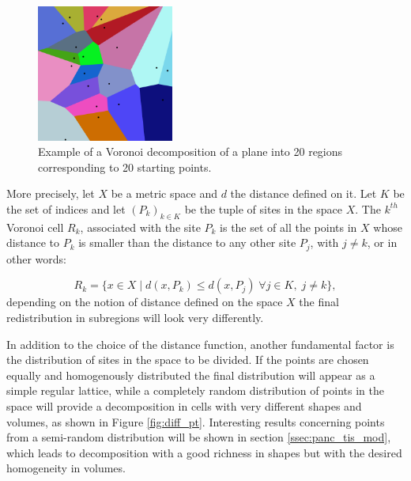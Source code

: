     \begin{figure}
        \centering
        \includegraphics[width = 0.4\textwidth]{images/vor_20}
        \caption{Example of a Voronoi decomposition of a plane into 20 regions corresponding to 20 starting points.}
        \label{fig:vor_20}
    \end{figure}

    More precisely, let $X$ be a metric space and $d$ the distance defined on it. Let $K$ be the set of indices and let $(P_k)_{k\in K}$ be the tuple of sites in the space $X$. The $k^{th}$ Voronoi cell $R_k$, associated with the site $P_k$ is the set of all the points in $X$ whose distance to $P_k$ is smaller than the distance to any other site $P_j$, with $j\neq k$, or in other words:

    \begin{equation}
        R_k = \{x \in X\;|\;d(x,P_k) \le d(x,P_j)\; \forall j \in K, \;j\neq k \}, \label{eq:formal_Vor_def}
    \end{equation}
    depending on the notion of distance defined on the space $X$ the final redistribution in subregions will look very differently.

    In addition to the choice of the distance function, another fundamental factor is the distribution of sites in the space to be divided. If the points are chosen equally and homogenously distributed the final distribution will appear as a simple regular lattice, while a completely random distribution of points in the space will provide a decomposition in cells with very different shapes and volumes, as shown in Figure \ref{fig:diff_pt}. Interesting results concerning points from a semi-random distribution will be shown in section \ref{ssec:panc_tis_mod}, which leads to decomposition with a good richness in shapes but with the desired homogeneity in volumes.

